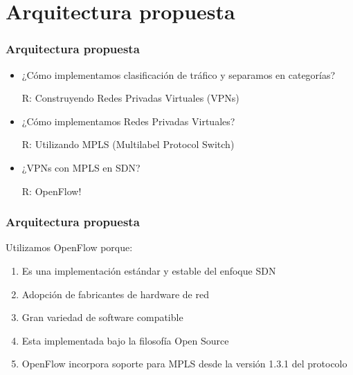 \documentclass{beamer}
\begin{document}
\section{Arquitectura propuesta} 
\frame{\tableofcontents[currentsection]}

\begin{frame}
\frametitle{Arquitectura propuesta} 

\begin{itemize}
\item ¿C\'omo implementamos clasificación de tr\'afico y separamos en categorías?

\pause
{\color{blue}R: Construyendo Redes Privadas Virtuales (VPNs)}
\pause

\vspace{0.5cm}
\item ¿C\'omo implementamos Redes Privadas Virtuales?

\pause
{\color{blue}R: Utilizando MPLS (Multilabel Protocol Switch)}

\pause
\vspace{0.5cm}
\item ¿VPNs con MPLS en SDN?

\pause
{\color{blue}R: OpenFlow!}

\end{itemize}

\end{frame}


\begin{frame}
\frametitle{Arquitectura propuesta} 

Utilizamos OpenFlow porque:

\begin{enumerate}[<+->]
\item Es una implementaci\'on estándar y estable del enfoque SDN
\item Adopci\'on de fabricantes de hardware de red
\item Gran variedad de software compatible
\item Esta implementada bajo la filosofía Open Source
\item OpenFlow incorpora soporte para MPLS desde la versi\'on 1.3.1 del protocolo
\end{enumerate}

\end{frame}
\end{document}
